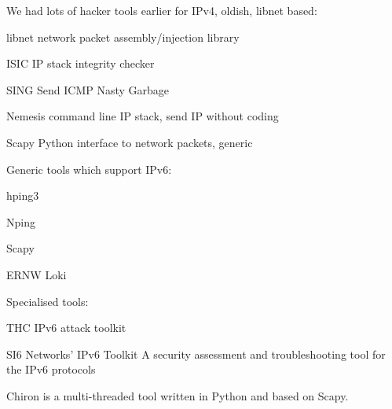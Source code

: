 \documentclass[18pt,landscape,a4paper,footrule]{foils}
\begin{document}

We had lots of hacker tools earlier for IPv4, oldish, libnet based:
\begin{list2}
\item libnet network packet assembly/injection library
\item ISIC IP stack integrity checker
\item SING Send ICMP Nasty Garbage
\item Nemesis command line IP stack, send IP without coding
\item Scapy Python interface to network packets, generic
\end{list2}


Generic tools which support IPv6:
\begin{list2}
\item hping3 
\item Nping 
\item Scapy 
\item ERNW Loki 
\end{list2}

Specialised tools:

\begin{list2}
\item THC IPv6 attack toolkit 
\item SI6 Networks' IPv6 Toolkit A security assessment and troubleshooting tool for the IPv6 protocols\\
\item Chiron is a multi-threaded tool written in Python and based on Scapy. 
\end{list2}

\end{document}
